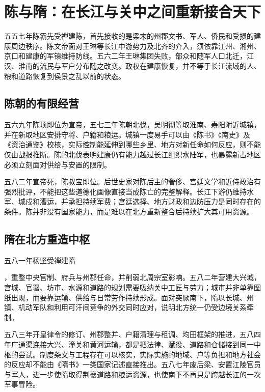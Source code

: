 \section{陈与隋：在长江与关中之间重新接合天下}
\label{sec:chen-sui-reunification}

五五七年陈霸先受禅建陈，首先接收的是梁末的州郡文书、军人、侨民和受损的建康周边秩序。陈文帝面对王琳等长江中游势力及北齐的介入，须依靠江州、湘州、京口和建康的军镇维持防线。五六二年王琳集团失败，部众和随军人口北迁，江汉、淮南的流民与军户分布随之改变。政权在建康恢复，并不等于长江流域的人、粮和道路恢复到侯景之乱以前的状态。

\subsection{陈朝的有限经营}

五六九年陈顼即位为宣帝，五七三年陈朝北伐，吴明彻等取淮南、寿阳附近城镇，并在新取地区安排守将、户籍和粮运。城镇一度易手可以由《陈书》《南史》及《资治通鉴》校核，实际控制能延伸到哪些乡里、地方对新任命如何反应，则不能仅由战报推断。陈的北伐表明建康仍有能力越过长江组织水陆军，也暴露新占地区必须立刻面对供给与安置的限制。

五八二年宣帝死，陈叔宝即位。后世史家对陈后主的奢侈、宫廷文学和近侍政治有强烈批评，不能把这些道德化画像直接当成陈亡的完整解释。长江下游仍维持水军、城戍和漕运，并承担持续军费；宫廷选择、地方财政和边防压力是同时存在的条件。陈并非没有国家能力，而是难以在北方重新整合后持续扩大其可用资源。

\subsection{隋在北方重造中枢}

\hypertarget{evt:NSL-440-589-271}{\textcolor{dynasty}{五八一年杨坚受禅建隋}}，重整中央官制、府兵与州郡任命，并削弱北周宗室影响。五八二年营建大兴城，宫城、官署、坊市、水源和道路的规划需要吸纳关中工匠与劳力；城市并非单靠图纸出现，而要靠运输、供给与日常劳作持续形成。面对突厥南下，隋以长城、州镇、机动军队和利用可汗间竞争的外交同时应对，说明北方统一仍受边境关系牵制。

五八三年开皇律令的修订、州郡整并、户籍清理与租调、均田框架的推进，五八四年广通渠连接大兴、潼关和黄河运输，都是把法律、赋役、道路和仓储接到同一中枢的尝试。制度条文与工程存在可以核实，实际实施的地域、户等负担和地方社会的反应却不能由《隋书》一类国家记述直接推出。五八七年废后梁、安置江陵官员与军人，进一步使隋取得荆襄道路和粮运资源，也使南下不再只是跨越长江的一次军事冒险。

